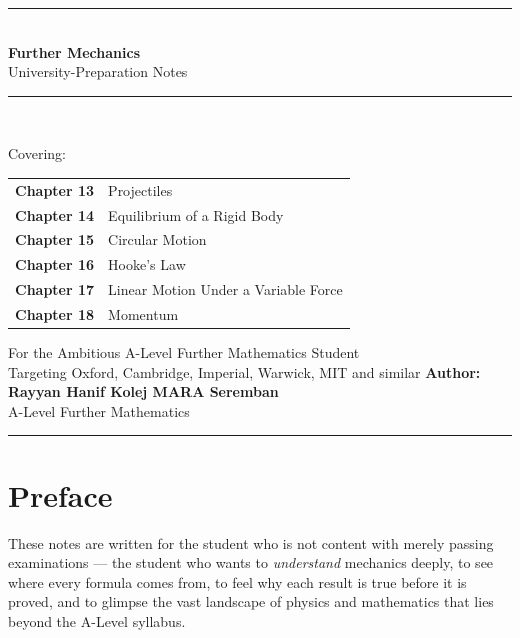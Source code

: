 \documentclass[12pt, a4paper]{book}
\begin{document}
\frontmatter

\begin{titlepage}
\centering
\vspace*{2cm}
{\color{deepblue}\rule{\textwidth}{2pt}}\\[0.5cm]
{\Huge\bfseries\sffamily\color{deepblue} Further Mechanics}\\[0.3cm]
{\Large\sffamily\color{midblue} University-Preparation Notes}\\[0.2cm]
{\color{deepblue}\rule{\textwidth}{2pt}}\\[1.5cm]

\begin{tcolorbox}[colback=lightblue, colframe=deepblue, width=0.85\textwidth]
\centering
{\large\sffamily Covering:}\\[0.4cm]
\begin{tabular}{ll}
\textbf{Chapter 13} & Projectiles \\[4pt]
\textbf{Chapter 14} & Equilibrium of a Rigid Body \\[4pt]
\textbf{Chapter 15} & Circular Motion \\[4pt]
\textbf{Chapter 16} & Hooke's Law \\[4pt]
\textbf{Chapter 17} & Linear Motion Under a Variable Force \\[4pt]
\textbf{Chapter 18} & Momentum \\
\end{tabular}
\end{tcolorbox}

\vspace{1.5cm}
{\large\sffamily\color{darkgray} For the Ambitious A-Level Further Mathematics Student}\\[0.3cm]
{\normalsize\sffamily\color{medgray} Targeting Oxford, Cambridge, Imperial, Warwick, MIT and similar}
\vfill
{\large\sffamily\bfseries Author: Rayyan Hanif Kolej MARA Seremban}\\[0.3cm]
{\normalsize\sffamily\color{medgray} A-Level Further Mathematics}
\vspace{1cm}
{\color{deepblue}\rule{\textwidth}{1pt}}
\end{titlepage}

\chapter*{Preface}

These notes are written for the student who is not content with merely passing examinations --- the student who wants to \emph{understand} mechanics deeply, to see where every formula comes from, to feel why each result is true before it is proved, and to glimpse the vast landscape of physics and mathematics that lies beyond the A-Level syllabus.
\end{document}
